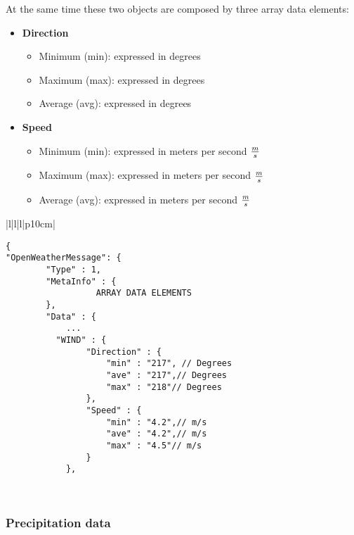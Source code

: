 At the same time these two objects are composed by three array data elements:

\begin{itemize}
\item \textbf{Direction}
	\begin{itemize}
	\item Minimum  (min): expressed in degrees
	\item Maximum (max): expressed in degrees
	\item Average   (avg): expressed in degrees
	\end{itemize}
\item \textbf{Speed}
	\begin{itemize}
	\item Minimum  (min): expressed in meters per second $m \over s$
	\item Maximum (max): expressed in meters per second $m \over s$
	\item Average   (avg): expressed in meters per second $m \over s$
	\end{itemize}
\end{itemize}

\begin{table}[H]
\centering
\begin{tabular}{|l|l|l|p{10cm}|}
\hline
\begin{minipage}[t]{\linewidth}
	\begin{verbatim}
{
"OpenWeatherMessage": {
        "Type" : 1,
        "MetaInfo" : {
	              ARRAY DATA ELEMENTS
        },
        "Data" : {
            ...
          "WIND" : {
                "Direction" : {
                    "min" : "217", // Degrees
                    "ave" : "217",// Degrees
                    "max" : "218"// Degrees
                },
                "Speed" : { 
                    "min" : "4.2",// m/s
                    "ave" : "4.2",// m/s
                    "max" : "4.5"// m/s
                }
            },
      \end{verbatim}
\end{minipage} \\
\hline
\end{tabular}
\caption{Wind data field with real-time in a data message of OpenWeather protocol.}
\end{table}

\subsubsection{Precipitation data}


